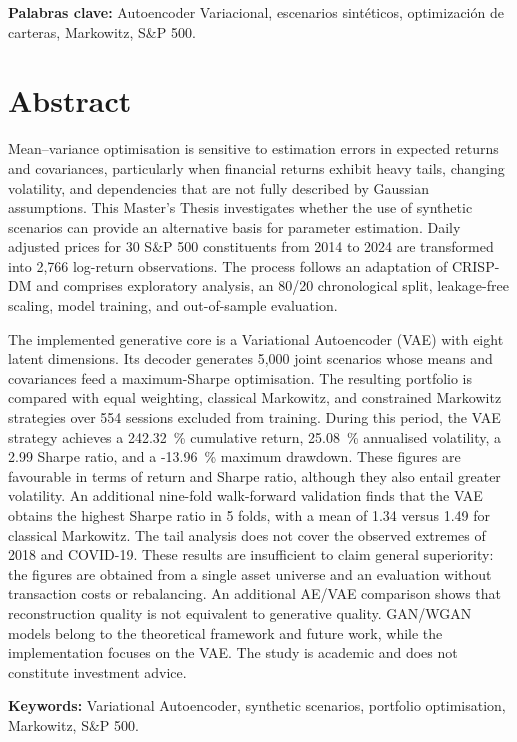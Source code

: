 \documentclass[11pt,a4paper,spanish]{book}
\begin{document}
\textbf{Palabras clave:} Autoencoder Variacional, escenarios sintéticos, optimización de carteras, Markowitz, S\&P 500.
\chapter{Abstract}
Mean--variance optimisation is sensitive to estimation errors in expected returns and covariances, particularly when financial returns exhibit heavy tails, changing volatility, and dependencies that are not fully described by Gaussian assumptions. This Master's Thesis investigates whether the use of synthetic scenarios can provide an alternative basis for parameter estimation. Daily adjusted prices for 30 S\&P 500 constituents from 2014 to 2024 are transformed into 2,766 log-return observations. The process follows an adaptation of CRISP-DM and comprises exploratory analysis, an 80/20 chronological split, leakage-free scaling, model training, and out-of-sample evaluation.

The implemented generative core is a Variational Autoencoder (VAE) with eight latent dimensions. Its decoder generates 5,000 joint scenarios whose means and covariances feed a maximum-Sharpe optimisation. The resulting portfolio is compared with equal weighting, classical Markowitz, and constrained Markowitz strategies over 554 sessions excluded from training. During this period, the VAE strategy achieves a 242.32~\% cumulative return, 25.08~\% annualised volatility, a 2.99 Sharpe ratio, and a -13.96~\% maximum drawdown. These figures are favourable in terms of return and Sharpe ratio, although they also entail greater volatility. An additional nine-fold walk-forward validation finds that the VAE obtains the highest Sharpe ratio in 5 folds, with a mean of 1.34 versus 1.49 for classical Markowitz. The tail analysis does not cover the observed extremes of 2018 and COVID-19. These results are insufficient to claim general superiority: the figures are obtained from a single asset universe and an evaluation without transaction costs or rebalancing. An additional AE/VAE comparison shows that reconstruction quality is not equivalent to generative quality. GAN/WGAN models belong to the theoretical framework and future work, while the implementation focuses on the VAE. The study is academic and does not constitute investment advice.

\textbf{Keywords:} Variational Autoencoder, synthetic scenarios, portfolio optimisation, Markowitz, S\&P 500.

\mainmatter









\backmatter

\renewcommand{\bibname}{Referencias bibliográficas}

\end{document}
